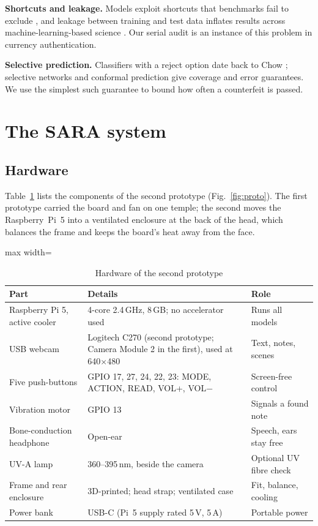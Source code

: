 \documentclass[preprint,12pt]{elsarticle}
\begin{document}
\textbf{Shortcuts and leakage.} Models exploit shortcuts that benchmarks fail to exclude \cite{geirhos2020shortcut}, and leakage between training and test data inflates results across machine-learning-based science \cite{kapoor2023leakage}. Our serial audit is an instance of this problem in currency authentication.

\textbf{Selective prediction.} Classifiers with a reject option date back to Chow \cite{chow1970}; selective networks \cite{selective2017} and conformal prediction \cite{vovk2005} give coverage and error guarantees. We use the simplest such guarantee to bound how often a counterfeit is passed.

\section{The SARA system}
\label{sec:system}

\subsection{Hardware}
Table~\ref{tab:hw} lists the components of the second prototype (Fig.~\ref{fig:proto}). The first prototype carried the board and fan on one temple; the second moves the Raspberry~Pi~5 \cite{raspberrypi5} into a ventilated enclosure at the back of the head, which balances the frame and keeps the board's heat away from the face.

\begin{table}[!htbp]
\caption{Hardware of the second prototype}
\label{tab:hw}
\centering\small
\begin{adjustbox}{max width=\textwidth}\begin{tabular}{@{}p{3.4cm}p{6.2cm}p{4.2cm}@{}}
\toprule
Part & Details & Role \\ \midrule
Raspberry Pi 5, active cooler & 4-core 2.4\,GHz, 8\,GB; no accelerator used & Runs all models \\
USB webcam & Logitech C270 (second prototype; Camera Module 2 in the first), used at 640$\times$480 & Text, notes, scenes \\
Five push-buttons & GPIO 17, 27, 24, 22, 23: MODE, ACTION, READ, VOL+, VOL$-$ & Screen-free control \\
Vibration motor & GPIO 13 & Signals a found note \\
Bone-conduction headphone & Open-ear & Speech, ears stay free \\
UV-A lamp & 360--395\,nm, beside the camera & Optional UV fibre check \\
Frame and rear enclosure & 3D-printed; head strap; ventilated case & Fit, balance, cooling \\
Power bank & USB-C (Pi~5 supply rated 5\,V, 5\,A) & Portable power \\ \bottomrule
\end{tabular}\end{adjustbox}
\end{table}
\end{document}
